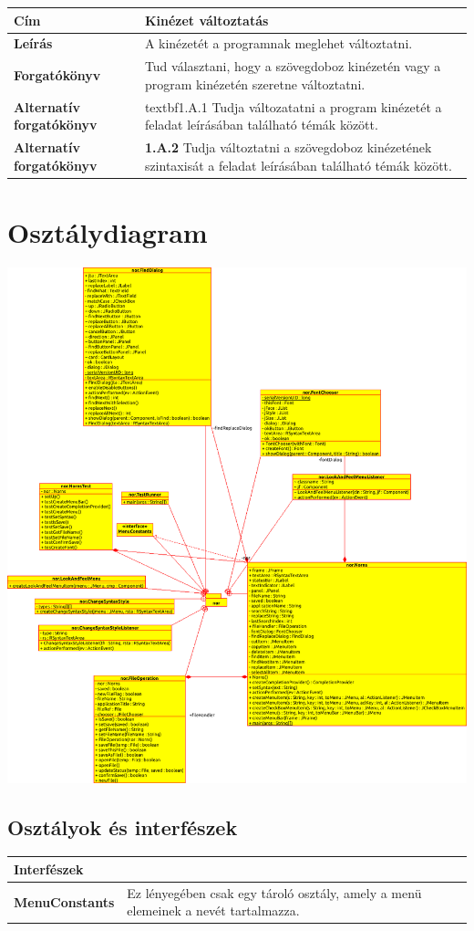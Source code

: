 \documentclass[12pt]{article}
\begin{document}
\begin{longtable}[h]{|p{5cm}|p{10cm}|}
  \hline
  \textbf{Cím} & \textbf{Kinézet változtatás} \\ \hline
  \textbf{Leírás} & A kinézetét a programnak meglehet változtatni. \\ \hline
  \textbf{Forgatókönyv} & Tud választani, hogy a szövegdoboz kinézetén vagy a
  program kinézetén szeretne változtatni. \\ \hline
  \textbf{Alternatív forgatókönyv} & textbf{1.A.1} Tudja változatatni a program
  kinézetét a feladat leírásában található témák között. \\ \hline
  \textbf{Alternatív forgatókönyv} & \textbf{1.A.2} Tudja változtatni a szövegdoboz
  kinézetének szintaxisát a feladat leírásában található témák között. \\ \hline
\end{longtable}

\section*{Osztálydiagram}
\includegraphics[width = \textwidth]{Uml}
\newpage
\subsection*{Osztályok és interfészek}
\begin{longtable}{|p{5cm}|p{10cm}|} \hline
    \multicolumn{2}{|p{15cm}|}{\textbf{Interfészek}}  \\ \hline
    \textbf{MenuConstants} & Ez lényegében csak egy tároló osztály, amely a menü elemeinek
    a nevét tartalmazza. \\ \hline
\end{longtable}
\end{document}
